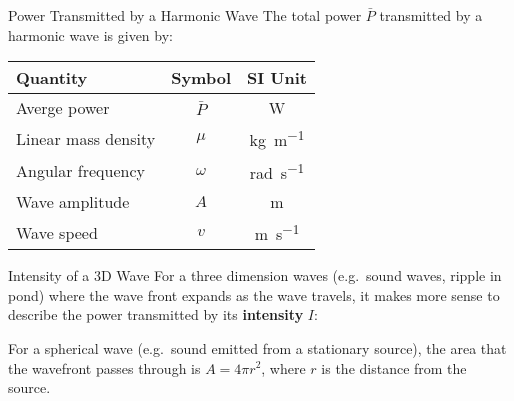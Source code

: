 \documentclass[12pt,aspectratio=169]{beamer}
\newcommand{\pic}[2]{\texttt{[image: \#2]}}
\newcommand{\eq}[2]{\vspace{#1}{\Large\begin{displaymath}#2\end{displaymath}}}
\begin{document}
\begin{frame}{Power Transmitted by a Harmonic Wave}
  The total power $\bar{P}$ transmitted by a harmonic wave is given by:

  \eq{-.2in}{
    \boxed{\bar{P}=\frac{1}{2}\mu\omega^2A^2v}
  }
  \begin{center}
    \begin{tabular}{l|c|c}
      \rowcolor{pink}
      \textbf{Quantity} & \textbf{Symbol} & \textbf{SI Unit} \\ \hline
      Averge power        & $\bar{P}$ & \si{\watt} \\
      Linear mass density & $\mu$     & \si{\kilo\gram\per\metre}\\
      Angular frequency   & $\omega$  & \si{rad\per\second}\\
      Wave amplitude      & $A$       & \si{\metre} \\
      Wave speed          & $v$       & \si{\metre\per\second}
    \end{tabular}
  \end{center}  
\end{frame}



\begin{frame}{Intensity of a 3D Wave}
  For a three dimension waves (e.g.\ sound waves, ripple in pond) where the
  wave front expands as the wave travels, it makes more sense to describe the
  power transmitted by its \textbf{intensity} $I$:

  \eq{-.25in}{
    \boxed{I=\frac{\bar{P}}{A}} %
  }

  For a spherical wave (e.g.\ sound emitted from a stationary source), the
  area that the wavefront passes through is $A=4\pi r^2$, where $r$ is the
  distance from the source.
\end{frame}





%
%
%
%
%
%
\end{document}
